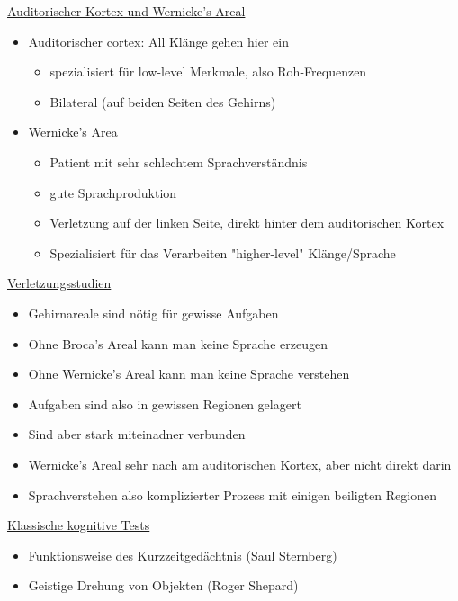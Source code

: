 \documentclass[a4paper,10pt,oneside]{article}
\begin{document}
\underline{Auditorischer Kortex und Wernicke's Areal} \\
	\begin{itemize}
		\item Auditorischer cortex: All Klänge gehen hier ein
			\begin{itemize}
				\item spezialisiert für low-level Merkmale, also Roh-Frequenzen
				\item Bilateral (auf beiden Seiten des Gehirns)
			\end{itemize}
		\item Wernicke's Area
			\begin{itemize}
				\item Patient mit sehr schlechtem Sprachverständnis
				\item gute Sprachproduktion
				\item Verletzung auf der linken Seite, direkt hinter dem auditorischen Kortex
				\item Spezialisiert für das Verarbeiten "higher-level" Klänge/Sprache
			\end{itemize}
	\end{itemize}

\underline{Verletzungsstudien} \\
	\begin{itemize}
		\item Gehirnareale sind nötig für gewisse Aufgaben
		\item Ohne Broca's Areal kann man keine Sprache erzeugen
		\item Ohne Wernicke's Areal kann man keine Sprache verstehen
		\item Aufgaben sind also in gewissen Regionen gelagert
		\item Sind aber stark miteinadner verbunden
		\item Wernicke's Areal sehr nach am auditorischen Kortex, aber nicht direkt darin
		\item Sprachverstehen also komplizierter Prozess mit einigen beiligten Regionen 
	\end{itemize}
	
\underline{Klassische kognitive Tests} \\
	\begin{itemize}
		\item  Funktionsweise des Kurzzeitgedächtnis (Saul Sternberg)
		\item Geistige Drehung von Objekten (Roger Shepard)
	\end{itemize}
	
\end{document}
